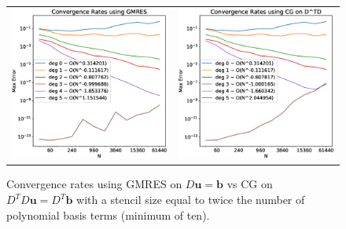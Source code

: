 \documentclass[12pt]{article}
\let\vec\mathbf
\begin{document}
	\begin{figure}
		\centering
		\begin{tabular}{cc}
			\includegraphics[width=.5\textwidth]{Convergence_GMRES.eps} & \includegraphics[width=.5\textwidth]{Convergence_Transpose.eps}
		\end{tabular}
		\caption{Convergence rates using GMRES on $D\vec{u}=\vec{b}$ vs CG on $D^TD\vec{u}=D^T\vec{b}$ with a stencil size equal to twice the number of polynomial basis terms (minimum of ten).}
		\label{convergence_cg}
	\end{figure}
	
\end{document}
